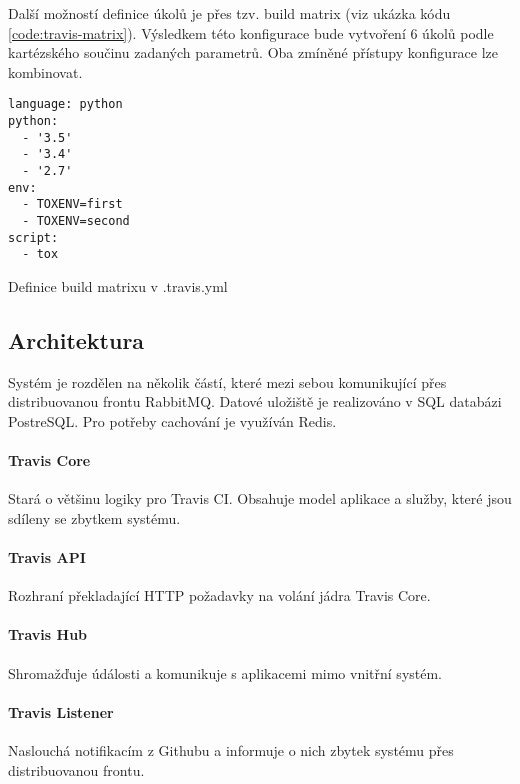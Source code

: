 Další možností definice úkolů je přes tzv. build matrix (viz ukázka kódu \ref{code:travis-matrix}).
Výsledkem této konfigurace bude vytvoření 6 úkolů podle kartézského součinu zadaných parametrů.
Oba zmíněné přístupy konfigurace lze kombinovat.

\begin{listing}[ht]
\begin{verbatim}
language: python
python:
  - '3.5'
  - '3.4'
  - '2.7'
env:
  - TOXENV=first
  - TOXENV=second
script:
  - tox
\end{verbatim}
\caption{\label{code:travis-matrix}Definice build matrixu v .travis.yml}
\end{listing}

\subsection{Architektura}

Systém je rozdělen na několik částí, které mezi sebou komunikující přes distribuovanou frontu RabbitMQ.
Datové uložiště je realizováno v SQL databázi PostreSQL.
Pro potřeby cachování je využíván Redis.


\paragraph{Travis Core}

Stará o většinu logiky pro Travis CI.
Obsahuje model aplikace a služby, které jsou sdíleny se zbytkem systému.

\paragraph{Travis API}

Rozhraní překladající HTTP požadavky na volání jádra Travis Core.

\paragraph{Travis Hub}

Shromažďuje údálosti a komunikuje s aplikacemi mimo vnitřní systém.

\paragraph{Travis Listener}

Naslouchá notifikacím z Githubu a informuje o nich zbytek systému přes distribuovanou frontu.

